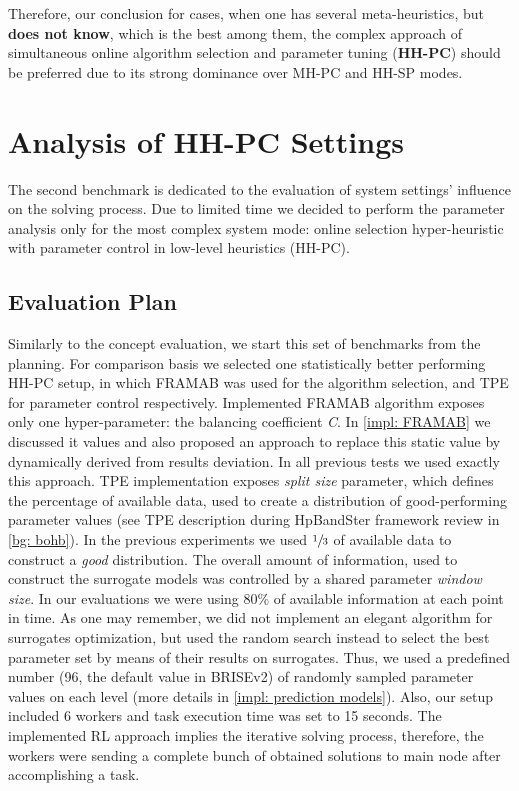 Therefore, our conclusion for cases, when one has several meta-heuristics, but \textbf{does not know}, which is the best among them, the complex approach of simultaneous online algorithm selection and parameter tuning (\textbf{HH-PC}) should be preferred due to its strong dominance over MH-PC and HH-SP modes.

\section{Analysis of HH-PC Settings}\label{eval:2}
The second benchmark is dedicated to the evaluation of system settings' influence on the solving process.
Due to limited time we decided to perform the parameter analysis only for the most complex system mode: online selection hyper-heuristic with parameter control in low-level heuristics (HH-PC).

\subsection{Evaluation Plan}\label{eval:2:plan}
Similarly to the concept evaluation, we start this set of benchmarks from the planning. For comparison basis we selected one statistically better performing HH-PC setup, in which FRAMAB was used for the algorithm selection, and TPE for parameter control respectively. Implemented FRAMAB algorithm exposes only one hyper-parameter: the balancing coefficient \emph{C}. In \cref{impl: FRAMAB} we discussed it values and also proposed an approach to replace this static value by dynamically derived from results deviation. In all previous tests we used exactly this approach. TPE implementation exposes \emph{split size} parameter, which defines the percentage of available data, used to create a distribution of good-performing parameter values (see TPE description during HpBandSter framework review in \cref{bg: bohb}). In the previous experiments we used $\sfrac{1}{3}$ of available data to construct a \emph{good} distribution. The overall amount of information, used to construct the surrogate models was controlled by a shared parameter \emph{window size}. In our evaluations we were using 80\% of available information at each point in time. As one may remember, we did not implement an  elegant algorithm for surrogates optimization, but used the random search instead to select the best parameter set by means of their results on surrogates. Thus, we used a predefined number (96, the default value in BRISEv2) of randomly sampled parameter values on each level (more details in \cref{impl: prediction models}). Also, our setup included 6 workers and task execution time was set to 15 seconds. The implemented RL approach implies the iterative solving process, therefore, the workers were sending a complete bunch of obtained solutions to main node after accomplishing a task. 

